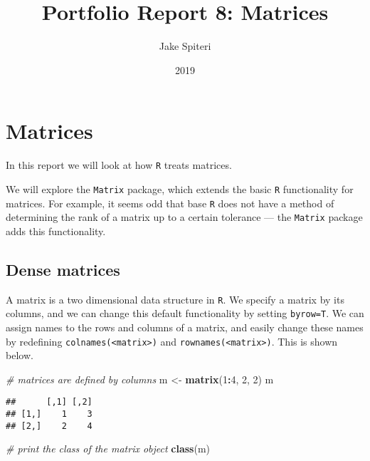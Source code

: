 \documentclass[]{article}
\title{Portfolio Report 8: Matrices}
\author{Jake Spiteri}
\date{2019}
\newenvironment{Shaded}{\begin{snugshade}}{\end{snugshade}}
\newcommand{\CommentTok}[1]{\textcolor[rgb]{0.56,0.35,0.01}{\textit{#1}}}
\newcommand{\DecValTok}[1]{\textcolor[rgb]{0.00,0.00,0.81}{#1}}
\newcommand{\KeywordTok}[1]{\textcolor[rgb]{0.13,0.29,0.53}{\textbf{#1}}}
\newcommand{\NormalTok}[1]{#1}
\newcommand{\OperatorTok}[1]{\textcolor[rgb]{0.81,0.36,0.00}{\textbf{#1}}}
\newcommand{\StringTok}[1]{\textcolor[rgb]{0.31,0.60,0.02}{#1}}
\begin{document}
\maketitle

\hypertarget{matrices}{%
\section{Matrices}\label{matrices}}

In this report we will look at how \texttt{R} treats matrices.

We will explore the \texttt{Matrix} package, which extends the basic
\texttt{R} functionality for matrices. For example, it seems odd that
base \texttt{R} does not have a method of determining the rank of a
matrix up to a certain tolerance --- the \texttt{Matrix} package adds
this functionality.

\hypertarget{dense-matrices}{%
\subsection{Dense matrices}\label{dense-matrices}}

A matrix is a two dimensional data structure in \texttt{R}. We specify a
matrix by its columns, and we can change this default functionality by
setting \texttt{byrow=T}. We can assign names to the rows and columns of
a matrix, and easily change these names by redefining
\texttt{colnames(\textless{}matrix\textgreater{})} and
\texttt{rownames(\textless{}matrix\textgreater{})}. This is shown below.

\begin{Shaded}
\begin{Highlighting}[]
\CommentTok{# matrices are defined by columns}
\NormalTok{m <-}\StringTok{ }\KeywordTok{matrix}\NormalTok{(}\DecValTok{1}\OperatorTok{:}\DecValTok{4}\NormalTok{, }\DecValTok{2}\NormalTok{, }\DecValTok{2}\NormalTok{)}
\NormalTok{m}
\end{Highlighting}
\end{Shaded}

\begin{verbatim}
##      [,1] [,2]
## [1,]    1    3
## [2,]    2    4
\end{verbatim}

\begin{Shaded}
\begin{Highlighting}[]
\CommentTok{# print the class of the matrix object}
\KeywordTok{class}\NormalTok{(m)}
\end{Highlighting}
\end{Shaded}
\end{document}
